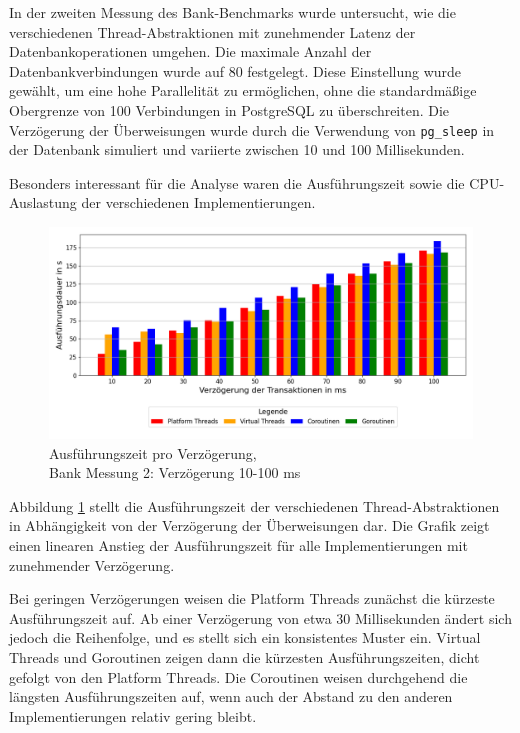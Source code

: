 \documentclass[fontsize=12pt,paper=a4,twoside=semi,parskip=half-,headsepline,headinclude]{scrreprt}
\begin{document}
In der zweiten Messung des Bank-Benchmarks wurde untersucht, wie die verschiedenen Thread-Abstraktionen mit zunehmender Latenz der Datenbankoperationen umgehen. Die maximale Anzahl der Datenbankverbindungen wurde auf 80 festgelegt. Diese Einstellung wurde gewählt, um eine hohe Parallelität zu ermöglichen, ohne die standardmäßige Obergrenze von 100 Verbindungen in PostgreSQL zu überschreiten. Die Verzögerung der Überweisungen wurde durch die Verwendung von \texttt{pg\_sleep} in der Datenbank simuliert und variierte zwischen 10 und 100 Millisekunden.

Besonders interessant für die Analyse waren die Ausführungszeit sowie die CPU-Auslastung der verschiedenen Implementierungen.

\begin{figure}[H]
	\centering
	\includegraphics[scale=0.5]{figures/bank/delay80/execution_time_plot.png}
	\caption{Ausführungszeit pro Verzögerung,\\ Bank Messung 2: Verzögerung 10-100 ms}
	\label{fig:bankDelay80Zeit}
\end{figure}

Abbildung \ref{fig:bankDelay80Zeit} stellt die Ausführungszeit der verschiedenen Thread-Abstraktionen in Abhängigkeit von der Verzögerung der Überweisungen dar. Die Grafik zeigt einen li\-ne\-aren Anstieg der Ausführungszeit für alle Implementierungen mit zunehmender Ver\-zö\-ge\-rung.

Bei geringen Verzögerungen weisen die Platform Threads zunächst die kürzeste Aus\-füh\-rungs\-zei\-t auf. Ab einer Verzögerung von etwa 30 Millisekunden ändert sich jedoch die Reihenfolge, und es stellt sich ein konsistentes Muster ein. Virtual Threads und Goroutinen zeigen dann die kürzesten Ausführungszeiten, dicht gefolgt von den Platform Threads. Die Coroutinen weisen durchgehend die längsten Ausführungszeiten auf, wenn auch der Abstand zu den anderen Implementierungen relativ gering bleibt.
\end{document}
